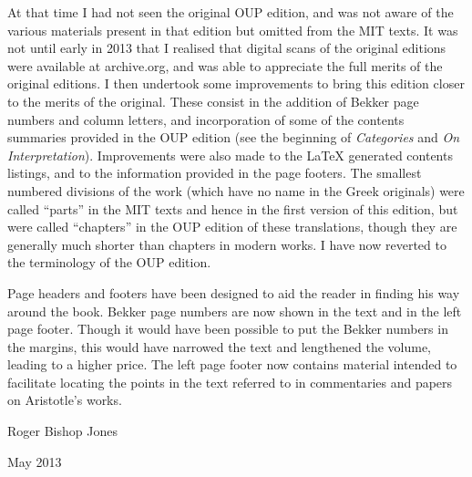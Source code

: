 At that time I had not seen the original OUP edition, and was not aware of the various materials present in that edition but omitted from the MIT texts.
It was not until early in 2013 that I realised that digital scans of the original editions were available at archive.org, and was able to appreciate the full merits of the original editions.
I then undertook some improvements to bring this edition closer to the merits of the original.
These consist in the addition of Bekker page numbers and column letters, and incorporation of some of the contents summaries provided in the OUP edition (see the beginning of \emph{Categories} and \emph{On Interpretation}).
Improvements were also made to the {\LaTeX} generated contents listings, and to the information provided in the page footers.
The smallest numbered divisions of the work (which have no name in the Greek originals) were called ``parts'' in the MIT texts and hence in the first version of this edition, but were called ``chapters'' in the OUP edition of these translations, though they are generally much shorter than chapters in modern works.
I have now reverted to the terminology of the OUP edition.

Page headers and footers have been designed to aid the reader in finding his way around the book.
Bekker page numbers are now shown in the text and in the left page footer.
Though it would have been possible to put the Bekker numbers in the margins, this would have narrowed the text and lengthened the volume, leading to a higher price.
The left page footer now contains material intended to facilitate locating the points in the text referred to in commentaries and papers on Aristotle's works.

\vspace{0.2in}

Roger Bishop Jones

May 2013

\vfill

\mainmatter

\renewcommand{\aref}{\arefC}



\backmatter

%
%




\renewcommand{\aref}{}
\renewcommand{\RbJsref}{}
\renewcommand{\volumename}{}
\renewcommand{\chaptermark}[1]{}
\renewcommand{\sectionmark}[1]{}

\printindex

\vfil



